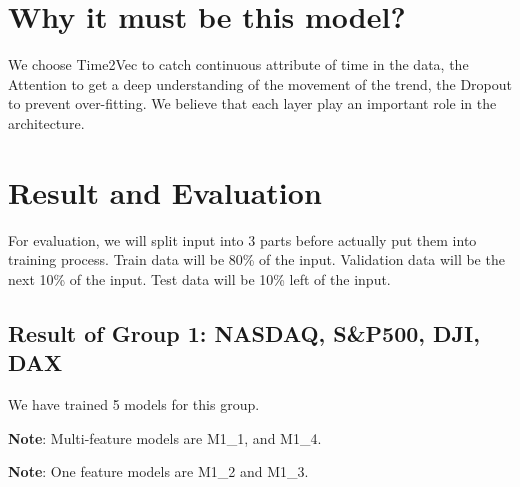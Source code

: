 \section{Why it must be this model?}
We choose Time2Vec to catch continuous attribute of time in the data, the Attention to get a deep understanding of the movement of the trend, the Dropout to prevent over-fitting. We believe that each layer play an important role in the architecture.

\section{Result and Evaluation}
For evaluation, we will split input into 3 parts before actually put them into training
process. Train data will be 80\% of the input. Validation data will be the next
10\% of the input. Test data will be 10\% left of the input.

\subsection{Result of Group 1: NASDAQ, S\&P500, DJI, DAX}
We have trained 5 models for this group.

\textbf{Note}: Multi-feature models are M1\_1, and M1\_4.

\textbf{Note}: One feature models are M1\_2 and M1\_3.

